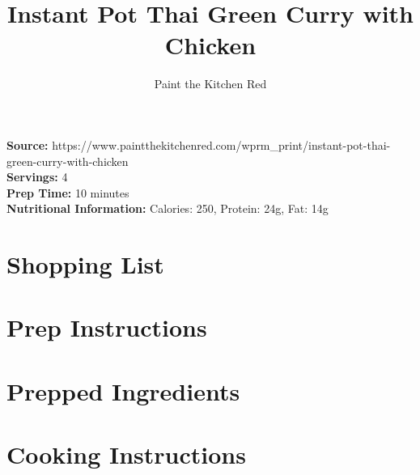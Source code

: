 \documentclass{article}
\title{Instant Pot Thai Green Curry with Chicken}
\author{Paint the Kitchen Red}
\date{}
\begin{document}
\maketitle

\noindent
\textbf{Source:} https://www.paintthekitchenred.com/wprm\_print/instant-pot-thai-green-curry-with-chicken \\
\textbf{Servings:} 4 \\
\textbf{Prep Time:} 10 minutes \\
\textbf{Nutritional Information:} Calories: 250, Protein: 24g, Fat: 14g

\section*{Shopping List}


\section*{Prep Instructions}


\newpage

\begin{multicols}{2}
\section*{Prepped Ingredients}


\columnbreak

\section*{Cooking Instructions}

\end{multicols}
\end{document}
